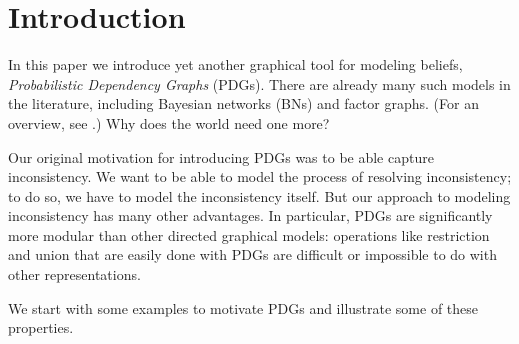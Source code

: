 \documentclass[letterpaper]{article} %
\theoremstyle{plain}
\theoremstyle{definition}
\theoremstyle{remark}
\begin{document}
\section{Introduction}

In this paper we introduce yet another graphical
tool
for modeling beliefs,
\emph{Probabilistic Dependency Graphs} (PDGs). There are already many
such models in the literature, including Bayesian networks (BNs) and
factor graphs. (For an overview, see 
\cite{KF09}.)
Why does the world need one more?  

Our original motivation for introducing PDGs was to be able capture
inconsistency. We want to be able to model the process of resolving
inconsistency; to do so, we have to model the inconsistency itself. But our
approach to modeling inconsistency has many other advantages. In particular,
PDGs are significantly more modular than other directed graphical models:
operations like restriction and union that are easily done with PDGs are
difficult or impossible to do with other representations.

We start with some examples to motivate PDGs and illustrate some of these properties.  
\end{document}
